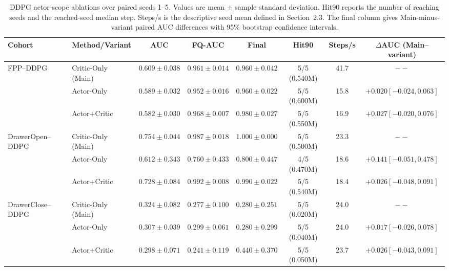 \begin{table}[t]
\centering
\small
\setlength{\tabcolsep}{3pt}
\begin{tabular}{llcccccc}
\toprule
Cohort & Method/Variant & AUC & FQ-AUC & Final & Hit90 & Steps/s & $\Delta$AUC (Main--variant) \\
\midrule
FPP--DDPG & Critic-Only (Main) & $0.609 \pm 0.038$ & $0.961 \pm 0.014$ & $0.960 \pm 0.042$ & 5/5 (0.540M) & 41.7 & $--$ \\
 & Actor-Only & $0.589 \pm 0.032$ & $0.952 \pm 0.016$ & $0.960 \pm 0.022$ & 5/5 (0.600M) & 15.8 & $+0.020 [-0.024,0.063]$ \\
 & Actor+Critic & $0.582 \pm 0.030$ & $0.968 \pm 0.007$ & $0.980 \pm 0.027$ & 5/5 (0.550M) & 16.9 & $+0.027 [-0.020,0.076]$ \\
\addlinespace[2pt]
DrawerOpen--DDPG & Critic-Only (Main) & $0.754 \pm 0.044$ & $0.987 \pm 0.018$ & $1.000 \pm 0.000$ & 5/5 (0.500M) & 23.3 & $--$ \\
 & Actor-Only & $0.612 \pm 0.343$ & $0.760 \pm 0.433$ & $0.800 \pm 0.447$ & 4/5 (0.470M) & 18.6 & $+0.141 [-0.051,0.478]$ \\
 & Actor+Critic & $0.728 \pm 0.084$ & $0.992 \pm 0.008$ & $0.990 \pm 0.022$ & 5/5 (0.540M) & 18.4 & $+0.026 [-0.048,0.091]$ \\
\addlinespace[2pt]
DrawerClose--DDPG & Critic-Only (Main) & $0.324 \pm 0.082$ & $0.277 \pm 0.100$ & $0.280 \pm 0.251$ & 5/5 (0.020M) & 24.0 & $--$ \\
 & Actor-Only & $0.307 \pm 0.039$ & $0.299 \pm 0.061$ & $0.280 \pm 0.299$ & 5/5 (0.040M) & 24.0 & $+0.017 [-0.026,0.078]$ \\
 & Actor+Critic & $0.298 \pm 0.071$ & $0.241 \pm 0.119$ & $0.440 \pm 0.370$ & 5/5 (0.050M) & 23.7 & $+0.026 [-0.043,0.091]$ \\
\bottomrule
\end{tabular}
\caption{DDPG actor-scope ablations over paired seeds 1--5. Values are mean $\pm$ sample standard deviation. Hit90 reports the number of reaching seeds and the reached-seed median step. Steps/s is the descriptive seed mean defined in Section~2.3. The final column gives Main-minus-variant paired AUC differences with 95\% bootstrap confidence intervals.}
\label{tab:supp-actor-scope}
\end{table}
